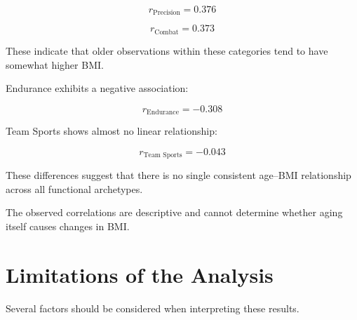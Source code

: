 \documentclass[11pt,a4paper]{article}
\begin{document}
\[
r_{\text{Precision}} = 0.376
\]

\[
r_{\text{Combat}} = 0.373
\]

These indicate that older observations within
these categories tend to have somewhat
higher BMI.

Endurance exhibits a negative association:

\[
r_{\text{Endurance}} = -0.308
\]

Team Sports shows almost no linear relationship:

\[
r_{\text{Team Sports}} = -0.043
\]

These differences suggest that there is no
single consistent age--BMI relationship
across all functional archetypes.

The observed correlations are descriptive
and cannot determine whether aging itself
causes changes in BMI.


\section{Limitations of the Analysis}

Several factors should be considered when
interpreting these results.
\end{document}

